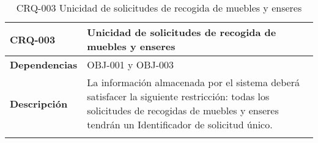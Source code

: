 \begin{center}
\begin{longtable}{|p{80pt}|p{9cm}|}
\hline
\textbf{CRQ-003} & Unicidad de solicitudes de recogida de muebles y enseres \\ \hline
\textbf{Dependencias} & OBJ-001 y OBJ-003 \\ \hline
\textbf{Descripción} & La información almacenada por el sistema deberá satisfacer la siguiente restricción: todas los solicitudes de recogidas de muebles y enseres tendrán un Identificador de solicitud único. \\ \hline
\caption{CRQ-003 Unicidad de solicitudes de recogida de muebles y enseres}
\end{longtable}
\end{center}
